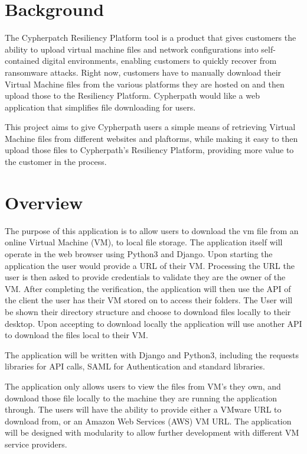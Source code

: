 \documentclass{article}
\begin{document}
    \section{Background}
	The Cypherpatch Resiliency Platform tool is a product that gives customers the ability to upload virtual machine files and network configurations into 
    self-contained digital environments, enabling customers to quickly recover from ransomware attacks. Right now, customers have to manually download their Virtual Machine files from
    the various platforms they are hosted on and then upload those to the Resiliency Platform. Cypherpath would like a web application that simplifies file downloading for users.

	This project aims to give Cypherpath users a simple means of retrieving Virtual Machine files from different websites and plaftorms, while making it easy to 
	then upload those files to Cypherpath's Resiliency Platform, providing more value to the customer in the process.


    \section{Overview}
    The purpose of this application is to allow users to download the vm file from an online Virtual Machine (VM), to local file storage.
    The application itself will operate in the web browser using Python3 and Django. Upon starting the application the user would
    provide a URL of their VM. Processing the URL the user is then asked to provide credentials to validate they are the owner of
    the VM. After completing the verification, the application will then use the API of the client the user has their VM stored on
    to access their folders. The User will be shown their directory structure and choose to download files locally to their desktop.
    Upon accepting to download locally the application will use another API to download the files local to their VM.

    The application will be written with Django and Python3, including the requests libraries for API calls, SAML for Authentication
    and standard libraries.

    The application only allows users to view the files from VM's they own, and download those file locally to the machine they 
    are running the application through. The users will have the ability to provide either a VMware URL to download from, or an
    Amazon Web Services (AWS) VM URL. The application will be designed with modularity to allow further 
    development with different VM service providers.  
\end{document}
